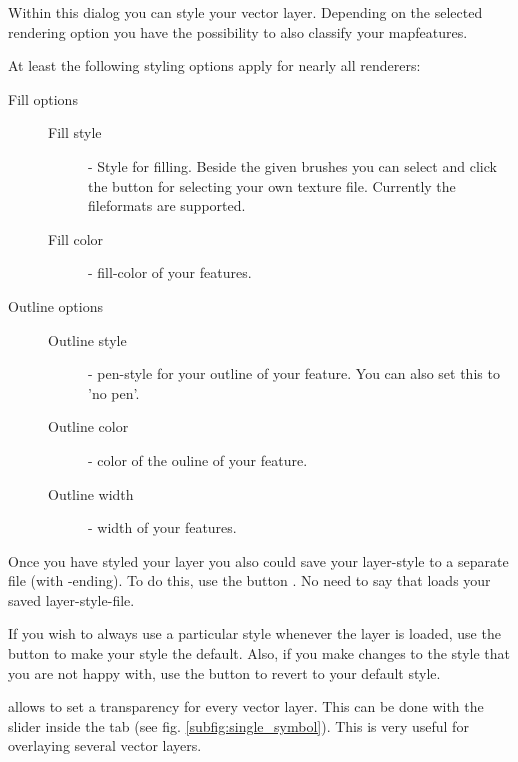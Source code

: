  \label{sec:style_options} 
Within this dialog you can style your vector layer. Depending on the selected
rendering option you have the possibility to also classify your mapfeatures.

At least the following styling options apply for nearly all renderers:
\begin{description}
\item[Fill options]
\begin{description}
 \item[Fill style] - Style for filling. Beside the given brushes you can
 select  and click the \browsebutton
 button for selecting your own texture file. Currently the fileformats
  are supported.
 \item[Fill color] - fill-color of your features.
\end{description}
\item[Outline options]
\begin{description}
 \item[Outline style] - pen-style for your outline of your feature. You can
 also set this to 'no pen'.
 \item[Outline color] - color of the ouline of your feature.
 \item[Outline width] - width of your features.
\end{description}
\end{description}

Once you have styled your layer you also could save your layer-style to a
separate file (with -ending).
To do this, use the button . No need to say that
 loads your saved layer-style-file.

If you wish to always use a particular style whenever the layer is loaded,
use the  button to make your style the default. Also,
if you make changes to the style that you are not happy with, use the 
 button to revert to your default style.

 \label{sec:vect_transparency}

\qg allows to set a transparency for every vector layer. This can be done with
the slider  inside the  tab (see
fig. \ref{subfig:single_symbol}). This is very useful for overlaying several
vector layers.

